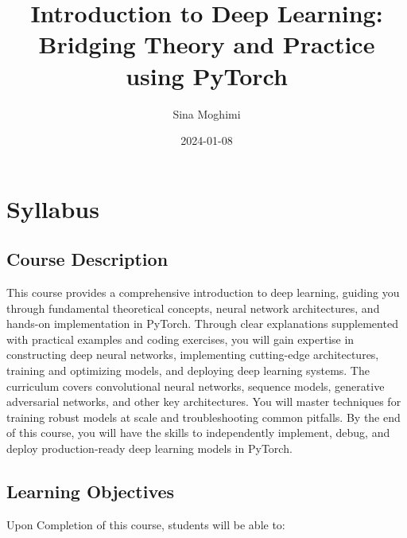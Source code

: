 \documentclass[
]{book}
\title{Introduction to Deep Learning: Bridging Theory and Practice using PyTorch}
\author{Sina Moghimi}
\date{2024-01-08}
\begin{document}
\maketitle

{
\setcounter{tocdepth}{1}
\tableofcontents
}
\hypertarget{syllabus}{%
\chapter{Syllabus}\label{syllabus}}

\hypertarget{course-description}{%
\section{Course Description}\label{course-description}}

This course provides a comprehensive introduction to deep learning, guiding you through fundamental theoretical concepts, neural network architectures, and hands-on implementation in PyTorch. Through clear explanations supplemented with practical examples and coding exercises, you will gain expertise in constructing deep neural networks, implementing cutting-edge architectures, training and optimizing models, and deploying deep learning systems. The curriculum covers convolutional neural networks, sequence models, generative adversarial networks, and other key architectures. You will master techniques for training robust models at scale and troubleshooting common pitfalls. By the end of this course, you will have the skills to independently implement, debug, and deploy production-ready deep learning models in PyTorch.

\hypertarget{learning-objectives}{%
\section{Learning Objectives}\label{learning-objectives}}

Upon Completion of this course, students will be able to:
\end{document}
